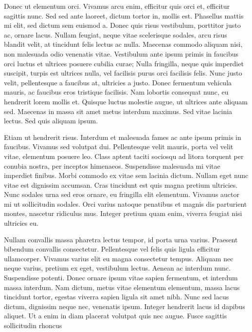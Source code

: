 Donec ut elementum orci. Vivamus arcu enim, efficitur quis orci et, efficitur sagittis nunc. Sed sed ante laoreet, dictum tortor in, mollis est. Phasellus mattis mi elit, sed dictum sem euismod a. Donec quis risus vestibulum, porttitor justo ac, ornare lacus. Nullam feugiat, neque vitae scelerisque sodales, arcu risus blandit velit, at tincidunt felis lectus ac nulla. Maecenas commodo aliquam nisi, non malesuada odio venenatis vitae. Vestibulum ante ipsum primis in faucibus orci luctus et ultrices posuere cubilia curae; Nulla fringilla, neque quis imperdiet suscipit, turpis est ultrices nulla, vel facilisis purus orci facilisis felis. Nunc justo velit, pellentesque a faucibus at, ultricies a justo. Donec fermentum vehicula mauris, ac faucibus eros tristique facilisis. Nam lobortis consequat nunc, eu hendrerit lorem mollis et. Quisque luctus molestie augue, ut ultrices ante aliquam sed. Maecenas in massa sit amet metus interdum maximus. Sed vitae lacinia lectus. Sed quis aliquam ipsum.

Etiam ut hendrerit risus. Interdum et malesuada fames ac ante ipsum primis in faucibus. Vivamus sed volutpat dui. Pellentesque velit mauris, porta vel velit vitae, elementum posuere leo. Class aptent taciti sociosqu ad litora torquent per conubia nostra, per inceptos himenaeos. Suspendisse malesuada mi vitae imperdiet finibus. Morbi commodo ex vitae sem lacinia dictum. Nullam eget nunc vitae est dignissim accumsan. Cras tincidunt est quis magna pretium ultricies. Nunc sodales urna sed eros ornare, eu fringilla elit elementum. Vivamus auctor mi ut sollicitudin sodales. Orci varius natoque penatibus et magnis dis parturient montes, nascetur ridiculus mus. Integer pretium quam enim, viverra feugiat nisi ultricies eu.

Nullam convallis massa pharetra lectus tempor, id porta urna varius. Praesent bibendum convallis consectetur. Pellentesque vel felis quis ligula efficitur ullamcorper. Vivamus varius elit eu magna consectetur tempus. Aliquam nec neque varius, pretium ex eget, vestibulum lectus. Aenean ac interdum nunc. Suspendisse potenti. Donec ornare ipsum vitae sapien fermentum, et interdum massa interdum. Nam dictum, metus vitae elementum elementum, massa lacus tincidunt tortor, egestas viverra sapien ligula sit amet nibh. Nunc sed lacus dictum, dignissim neque nec, venenatis ipsum. Integer hendrerit lacus id dapibus aliquet. Ut a enim in diam placerat volutpat quis nec augue. Fusce sagittis sollicitudin rhoncus

\bye
